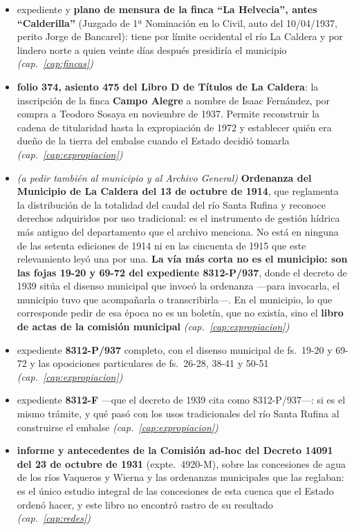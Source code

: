 \begin{itemize}[leftmargin=*]
\item expediente y \textbf{plano de mensura de la finca ``La Helvecia'', antes ``Calderilla''} (Juzgado de 1ª Nominación en lo Civil, auto del 10/04/1937, perito Jorge de Bancarel): tiene por límite occidental el río La Caldera y por lindero norte a quien veinte días después presidiría el municipio \textit{(cap.\ \ref{cap:fincas})}
\item \textbf{folio 374, asiento 475 del Libro D de Títulos de La Caldera}: la inscripción de la finca \textbf{Campo Alegre} a nombre de Isaac Fernández, por compra a Teodoro Sosaya en noviembre de 1937. Permite reconstruir la cadena de titularidad hasta la expropiación de 1972 y establecer quién era dueño de la tierra del embalse cuando el Estado decidió tomarla \textit{(cap.\ \ref{cap:expropiacion})}
\item \textit{(a pedir también al municipio y al Archivo General)} \textbf{Ordenanza del Municipio de La Caldera del 13 de octubre de 1914}, que reglamenta la distribución de la totalidad del caudal del río Santa Rufina y reconoce derechos adquiridos por uso tradicional: es el instrumento de gestión hídrica más antiguo del departamento que el archivo menciona. No está en ninguna de las setenta ediciones de 1914 ni en las cincuenta de 1915 que este relevamiento leyó una por una. \textbf{La vía más corta no es el municipio: son las fojas 19-20 y 69-72 del expediente 8312-P/937}, donde el decreto de 1939 sitúa el disenso municipal que invocó la ordenanza ---para invocarla, el municipio tuvo que acompañarla o transcribirla---. En el municipio, lo que corresponde pedir de esa época no es un boletín, que no existía, sino el \textbf{libro de actas de la comisión municipal} \textit{(cap.\ \ref{cap:expropiacion})}
\item expediente \textbf{8312-P/937} completo, con el disenso municipal de fs.\ 19-20 y 69-72 y las oposiciones particulares de fs.\ 26-28, 38-41 y 50-51 \textit{(cap.\ \ref{cap:expropiacion})}
\item expediente \textbf{8312-F} ---que el decreto de 1939 cita como 8312-P/937---: si es el mismo trámite, y qué pasó con los usos tradicionales del río Santa Rufina al construirse el embalse \textit{(cap.\ \ref{cap:expropiacion})}
\item \textbf{informe y antecedentes de la Comisión ad-hoc del Decreto 14091 del 23 de octubre de 1931} (expte.\ 4920-M), sobre las concesiones de agua de los ríos Vaqueros y Wierna y las ordenanzas municipales que las reglaban: es el único estudio integral de las concesiones de esta cuenca que el Estado ordenó hacer, y este libro no encontró rastro de su resultado \textit{(cap.\ \ref{cap:redes})}

\end{itemize}
